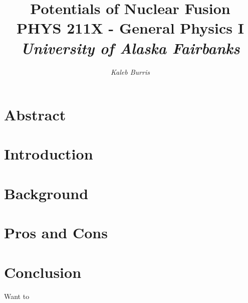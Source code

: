 \documentclass[12pt]{article}
\title{
    \textbf{Potentials of Nuclear Fusion} 
    \\
    \large PHYS 211X - General Physics I
    \\
    \emph{University of Alaska Fairbanks}
}
\date{}
\author{
    {\em Kaleb Burris}
}
\begin{document}
    \maketitle

    \thispagestyle{plain}

    \section{Abstract}

    \lipsum[1-2]

    \pagebreak

    \section{Introduction}

    \lipsum[3-5]

    \pagebreak

    \section{Background}

    \lipsum[6-9]

    \pagebreak

    \section{Pros and Cons}

    \lipsum[10-14]

    \pagebreak

    \section{Conclusion}

    \lipsum[15-19]

    \pagebreak

    \citep[p. 54]{advmaterials} Want to

    
    
\end{document}
